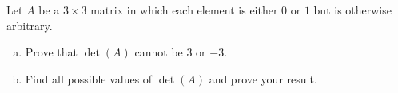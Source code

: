 Let $A$ be a $3 \times 3$ matrix in which each element is either $0$ or $1$ but
is otherwise arbitrary.

\begin{enumerate}[(a)]
\item Prove that $\det(A)$ cannot be $3$ or $-3$.
\item Find all possible values of $\det(A)$ and prove your result.
\end{enumerate}
